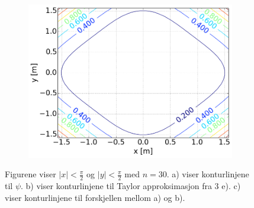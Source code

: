 \begin{figure}[H]
\begin{subfigure}{0.3\textwidth}
        \includegraphics[width=\linewidth]{../4a_2_0,5_30.png}
        \caption{}
    \end{subfigure}
    \caption{Figurene viser $|x| < \frac{\pi}{2}$ og
    $|y| < \frac{\pi}{2}$ med $n = 30$.
    \color{blue} a) \color{black}
     viser konturlinjene
    til $\psi$.
    \color{blue} b) \color{black}
     viser konturlinjene til Taylor approksimasjon
    fra 3 e).
    \color{blue} c) \color{black}
     viser konturlinjene til forskjellen mellom a) og b).}
    \label{fig_4a_second}
\end{figure}

